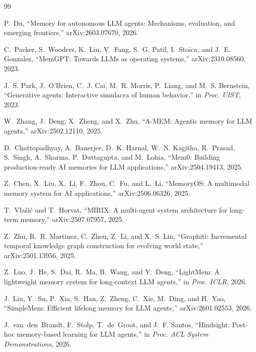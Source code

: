\documentclass[11pt]{article}
\begin{document}
\begin{thebibliography}{99}

P.~Du, ``Memory for autonomous LLM agents: Mechanisms, evaluation, and emerging
frontiers,'' arXiv:2603.07670, 2026.

C.~Packer, S.~Wooders, K.~Lin, V.~Fang, S.~G. Patil, I.~Stoica, and J.~E.
Gonzalez, ``MemGPT: Towards LLMs as operating systems,'' arXiv:2310.08560, 2023.

J.~S. Park, J.~O'Brien, C.~J. Cai, M.~R. Morris, P.~Liang, and M.~S. Bernstein,
``Generative agents: Interactive simulacra of human behavior,'' in
\emph{Proc. UIST}, 2023.

W.~Zhang, J.~Deng, X.~Zheng, and X.~Zhu, ``A-MEM: Agentic memory for LLM
agents,'' arXiv:2502.12110, 2025.

D.~Chattopadhyay, A.~Banerjee, D.~K. Harnal, W.~N. Kagitha, R.~Prasad, S.~Singh,
A.~Sharma, P.~Duttagupta, and M.~Lohia, ``Mem0: Building production-ready AI
memories for LLM applications,'' arXiv:2504.19413, 2025.

Z.~Chen, X.~Liu, X.~Li, F.~Zhou, C.~Fu, and L.~Li, ``MemoryOS: A multimodal
memory system for AI applications,'' arXiv:2506.06326, 2025.

T.~Vla{\v{s}}i{\'c} and T.~Horvat, ``MIRIX: A multi-agent system architecture
for long-term memory,'' arXiv:2507.07957, 2025.

Z.~Zhu, R.~R. Martinez, C.~Zhou, Z.~Li, and X.~S. Lin, ``Graphiti: Incremental
temporal knowledge graph construction for evolving world state,'' arXiv:2501.13956,
2025.

Z.~Luo, J.~He, S.~Dai, R.~Ma, B.~Wang, and Y.~Deng, ``LightMem: A lightweight
memory system for long-context LLM agents,'' in \emph{Proc. ICLR}, 2026.

J.~Liu, Y.~Su, P.~Xia, S.~Han, Z.~Zheng, C.~Xie, M.~Ding, and H.~Yao,
``SimpleMem: Efficient lifelong memory for LLM agents,'' arXiv:2601.02553, 2026.

J.~van~den~Brandt, F.~Stolp, T.~de~Groot, and J.~F. Santos, ``Hindsight:
Post-hoc memory-based learning for LLM agents,'' in \emph{Proc. ACL System
Demonstrations}, 2026.


\end{thebibliography}
\end{document}
